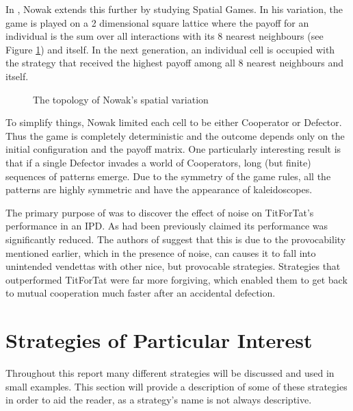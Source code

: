 In \cite{Nowak1992, Nowak1993, Nowak1994}, Nowak extends this further by studying Spatial Games.
In his variation, the game is played on a 2 dimensional square lattice where the payoff for an individual is the sum over all interactions with its 8 nearest neighbours (see Figure \ref{fig:nowak_spatial}) and itself.
In the next generation, an individual cell is occupied with the strategy that received the highest payoff among all 8 nearest neighbours and itself.

\begin{figure}[hbtp!]
    \centering
    \caption{The topology of Nowak's spatial variation}
    \label{fig:nowak_spatial}
\end{figure}

To simplify things, Nowak limited each cell to be either Cooperator or Defector.
Thus the game is completely deterministic and the outcome depends only on the initial configuration and the payoff matrix.
One particularly interesting result is that if a single Defector invades a world of Cooperators, long (but finite) sequences of patterns emerge.
Due to the symmetry of the game rules, all the patterns are highly symmetric and have the appearance of kaleidoscopes.

The primary purpose of \cite{Bendor1991} was to discover the effect of noise on TitForTat's performance in an IPD.
As had been previously claimed its performance was significantly reduced.
The authors of \cite{Bendor1991} suggest that this is due to the provocability mentioned earlier, which in the presence of noise, can causes it to fall into unintended vendettas with other nice, but provocable strategies.
Strategies that outperformed TitForTat were far more forgiving, which enabled them to get back to mutual cooperation much faster after an accidental defection.

\section{Strategies of Particular Interest}\label{sec:individual_strategies}
Throughout this report many different strategies will be discussed and used in small examples.
This section will provide a description of some of these strategies in order to aid the reader, as a strategy's name is not always descriptive.

